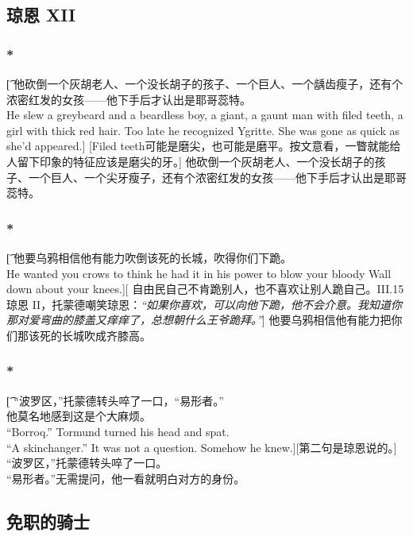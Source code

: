 \documentclass[12pt,a4paper]{article}
\begin{document}
\subsection{琼恩 XII}
\subsubsection{\color{red}*}\t[	
	他砍倒一个灰胡老人、一个没长胡子的孩子、一个巨人、一个龋齿瘦子，还有个浓密红发的女孩——他下手后才认出是耶哥蕊特。\\
	He slew a greybeard and a beardless boy, a giant, a gaunt man with filed teeth, a girl with thick red hair. Too late he recognized Ygritte. She was gone as quick as she'd appeared.]
	[Filed teeth可能是磨尖，也可能是磨平。按文意看，一瞥就能给人留下印象的特征应该是磨尖的牙。]
	他砍倒一个灰胡老人、一个没长胡子的孩子、一个巨人、一个尖牙瘦子，还有个浓密红发的女孩——他下手后才认出是耶哥蕊特。

\subsubsection{\color{red}*}\t[	
	他要乌鸦相信他有能力吹倒该死的长城，吹得你们下跪。\\
	He wanted you crows to think he had it in his power to blow your bloody Wall down about your knees.][
	自由民自己不肯跪别人，也不喜欢让别人跪自己。III.15琼恩 II，托蒙德嘲笑琼恩：\emph{“如果你喜欢，可以向他下跪，他不会介意。我知道你那对爱弯曲的膝盖又痒痒了，总想朝什么王爷跪拜。”}]
		他要乌鸦相信他有能力把你们那该死的长城吹成齐膝高。

\subsubsection{\color{red}*}\t[	
	“波罗区，”托蒙德转头啐了一口，“易形者。”\\
	他莫名地感到这是个大麻烦。\\
	“Borroq.” Tormund turned his head and spat.\\
	“A skinchanger.” It was not a question. Somehow he knew.][第二句是琼恩说的。]
	“波罗区，”托蒙德转头啐了一口。\\
	“易形者。”无需提问，他一看就明白对方的身份。
	
	
\subsection{免职的骑士}
\end{document}
